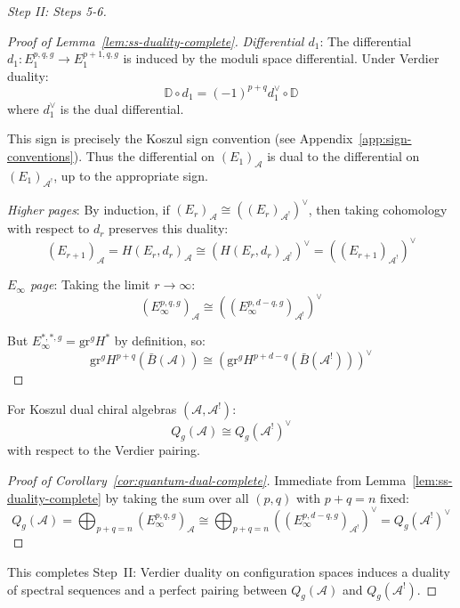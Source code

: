 \begin{proof}[Step II: Steps 5-6]
\begin{proof}[Proof of Lemma~\ref{lem:ss-duality-complete}]
\emph{Differential $d_1$}: The differential $d_1: E_1^{p,q,g} \to E_1^{p+1,q,g}$ is 
induced by the moduli space differential. Under Verdier duality:
\begin{equation}
\mathbb{D} \circ d_1 = (-1)^{p+q} d_1^\vee \circ \mathbb{D}
\end{equation}
where $d_1^\vee$ is the dual differential.

This sign is precisely the Koszul sign convention (see Appendix~\ref{app:sign-conventions}). 
Thus the differential on $(E_1)_{\mathcal{A}}$ is dual to the differential on 
$(E_1)_{\mathcal{A}^!}$, up to the appropriate sign.

\emph{Higher pages}: By induction, if $(E_r)_{\mathcal{A}} \cong ((E_r)_{\mathcal{A}^!})^\vee$, 
then taking cohomology with respect to $d_r$ preserves this duality:
\begin{equation}
(E_{r+1})_{\mathcal{A}} = H(E_r, d_r)_{\mathcal{A}} \cong (H(E_r, d_r)_{\mathcal{A}^!})^\vee 
= ((E_{r+1})_{\mathcal{A}^!})^\vee
\end{equation}

\emph{$E_\infty$ page}: Taking the limit $r \to \infty$:
\begin{equation}
(E_\infty^{p,q,g})_{\mathcal{A}} \cong ((E_\infty^{p,d-q,g})_{\mathcal{A}^!})^\vee
\end{equation}

But $E_\infty^{*,*,g} = \text{gr}^g H^*$ by definition, so:
\begin{equation}
\text{gr}^g H^{p+q}(\bar{B}(\mathcal{A})) \cong (\text{gr}^g H^{p+d-q}(\bar{B}(
\mathcal{A}^!)))^\vee
\end{equation}
\end{proof}

\begin{corollary}
\label{cor:quantum-dual-complete}
For Koszul dual chiral algebras $(\mathcal{A}, \mathcal{A}^!)$:
\begin{equation}
Q_g(\mathcal{A}) \cong Q_g(\mathcal{A}^!)^\vee
\end{equation}
with respect to the Verdier pairing.
\end{corollary}

\begin{proof}[Proof of Corollary~\ref{cor:quantum-dual-complete}]
Immediate from Lemma~\ref{lem:ss-duality-complete} by taking the sum over all $(p,q)$ with 
$p+q = n$ fixed:
\begin{equation}
Q_g(\mathcal{A}) = \bigoplus_{p+q=n} (E_\infty^{p,q,g})_{\mathcal{A}} \cong 
\bigoplus_{p+q=n} ((E_\infty^{p,d-q,g})_{\mathcal{A}^!})^\vee = Q_g(\mathcal{A}^!)^\vee
\end{equation}
\end{proof}

This completes Step~II: Verdier duality on configuration spaces
induces a duality of spectral sequences and a perfect pairing
between $Q_g(\mathcal{A})$ and $Q_g(\mathcal{A}^!)$.
\end{proof}

